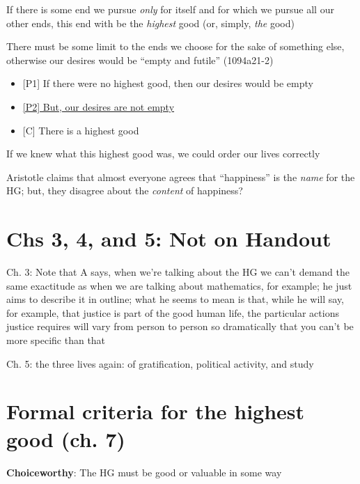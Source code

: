 \documentclass[11pt]{article}
\begin{document}
\noindent [5] If there is some end we pursue \emph{only} for itself and for which we pursue all our other ends, this end with be the \emph{highest} good (or, simply, \emph{the} good) 

\vspace*{2mm}

\noindent [6] There must be some limit to the ends we choose for the sake of something else, otherwise our desires would be ``empty and futile'' (1094a21-2)
\begin{itemize}\item{[P1] If there were no highest good, then our desires would be empty}\item{\underline{[P2] But, our desires are not empty}}\item{[C] There is a highest good}\end{itemize}

\noindent [7] If we knew what this highest good was, we could order our lives correctly
\vspace*{2mm}

\noindent [8] \noindent Aristotle claims that almost everyone agrees that ``happiness'' is the \emph{name} for the HG; but, they disagree about the \emph{content} of happiness?

\section*{Chs 3, 4, and 5: Not on Handout}

\noindent Ch. 3: Note that A says, when we're talking about the HG we can't demand the same exactitude as when we are talking about mathematics, for example; he just aims to describe it in outline; what he seems to mean is that, while he will say, for example, that justice is part of the good human life, the particular actions justice requires will vary from person to person so dramatically that you can't be more specific than that
\vspace*{2mm}

\noindent Ch. 5: the three lives again: of gratification, political activity, and study

\section*{Formal criteria for the highest good (ch. 7)}

\noindent [A] \textbf{Choiceworthy}: The HG must be good or valuable in some way
\vspace*{1mm}
\end{document}
